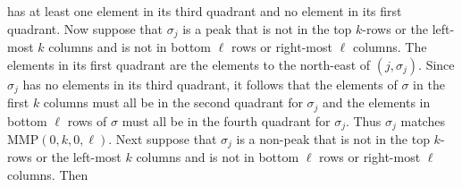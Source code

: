 \documentclass[
final,nomarks
]{dmtcs-episciences}
\newcommand{\MMP}{\mathrm{MMP}}
\begin{document}
has at least one element in its third quadrant and no element in its first quadrant. 
Now suppose that \begin{math}\sigma_j\end{math} is a peak that is not in the top \begin{math}k\end{math}-rows or the left-most 
\begin{math}k\end{math} columns and is not in bottom \begin{math}\ell\end{math} rows or right-most \begin{math}\ell\end{math} columns. 
The elements in its first quadrant are the elements to the north-east 
of \begin{math}(j,\sigma_j)\end{math}. Since \begin{math}\sigma_j\end{math} has no elements in its third quadrant, it follows that 
the elements of \begin{math}\sigma\end{math} in the first \begin{math}k\end{math} columns must all be in the second quadrant for \begin{math}\sigma_j\end{math} 
and the elements in bottom \begin{math}\ell\end{math} rows of \begin{math}\sigma\end{math} must all be in the fourth quadrant for \begin{math}\sigma_j\end{math}. 
Thus \begin{math}\sigma_j\end{math} matches \begin{math}\MMP(0,k,0,\ell)\end{math}. Next suppose that \begin{math}\sigma_j\end{math} is a 
non-peak that is not in the top \begin{math}k\end{math}-rows or the left-most 
\begin{math}k\end{math} columns and is not in bottom \begin{math}\ell\end{math} rows or right-most \begin{math}\ell\end{math} columns. Then  
\end{document}
